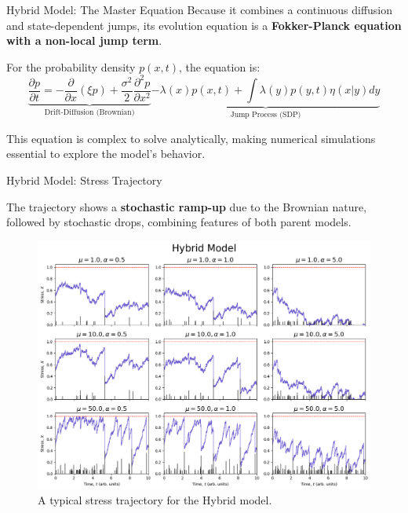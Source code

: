 \begin{frame}{Hybrid Model: The Master Equation}
	Because it combines a continuous diffusion and state-dependent jumps, its evolution equation is a \textbf{Fokker-Planck equation with a non-local jump term}.

    \vspace{0.3cm}
    For the probability density $p(x, t)$, the equation is:
    \begin{equation}
    \underbrace{\frac{\partial p}{\partial t} = -\frac{\partial}{\partial x}(\xi p) + \frac{\sigma^2}{2}\frac{\partial^2 p}{\partial x^2}}_{\text{Drift-Diffusion (Brownian)}} \underbrace{-\lambda(x)p(x,t) + \int \lambda(y)p(y,t)\eta(x|y)dy}_{\text{Jump Process (SDP)}}
    \end{equation}
    \vspace{0.3cm}

    This equation is complex to solve analytically, making numerical simulations essential to explore the model's behavior.
\end{frame}

\begin{frame}{Hybrid Model: Stress Trajectory}

    \vspace{-0.5em}
	The trajectory shows a \textbf{stochastic ramp-up} due to the Brownian nature, followed by stochastic drops, combining features of both parent models.

    \vspace{-0.5em}
	\begin{figure}
        \centering
        \includegraphics[width=0.79\linewidth,trim={0 0 10 41},clip]{assets/traj_hybrid.png}
        \vspace{-1em}
        \caption{A typical stress trajectory for the Hybrid model.}
    \end{figure}
\end{frame}

